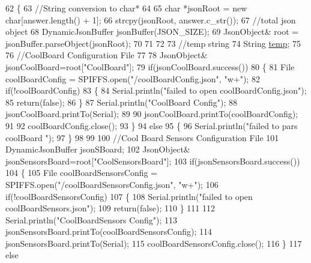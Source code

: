 \begin{DoxyCode}
62 \{
63     \textcolor{comment}{//String conversion to char*}
64 
65     \textcolor{keywordtype}{char} *jsonRoot = \textcolor{keyword}{new} \textcolor{keywordtype}{char}[answer.length() + 1];
66     strcpy(jsonRoot, answer.c\_str());
67     \textcolor{comment}{//total json object }
68     DynamicJsonBuffer jsonBuffer(JSON\_SIZE);
69     JsonObject& root = jsonBuffer.parseObject(jsonRoot);
70 
71 
72         
73     \textcolor{comment}{//temp string}
74     String \hyperlink{Irene3000_8h_a5905d48604152cf57aa6bfa087b49173}{temp};
75 
76     \textcolor{comment}{//CoolBoard Configuration File}
77 
78         JsonObject& jsonCoolBoard=root[\textcolor{stringliteral}{"CoolBoard"}];
79     \textcolor{keywordflow}{if}(jsonCoolBoard.success())
80     \{
81         File coolBoardConfig = SPIFFS.open(\textcolor{stringliteral}{"/coolBoardConfig.json"}, \textcolor{stringliteral}{"w+"});  
82         \textcolor{keywordflow}{if}(!coolBoardConfig)
83         \{   
84             Serial.println(\textcolor{stringliteral}{"failed to open coolBoardConfig.json"});
85             \textcolor{keywordflow}{return}(\textcolor{keyword}{false});
86         \}
87         Serial.println(\textcolor{stringliteral}{"CoolBoard Config"});
88         jsonCoolBoard.printTo(Serial);
89         
90         jsonCoolBoard.printTo(coolBoardConfig);
91         
92         coolBoardConfig.close();
93     \}
94     \textcolor{keywordflow}{else}
95     \{
96         Serial.println(\textcolor{stringliteral}{"failed to pars coolBoard "});
97     \}       
98 
99     
100     \textcolor{comment}{//Cool Board Sensors Configuration File}
101     DynamicJsonBuffer jsonSBoard;
102         JsonObject& jsonSensorsBoard=root[\textcolor{stringliteral}{"CoolSensorsBoard"}];  
103     \textcolor{keywordflow}{if}(jsonSensorsBoard.success())
104     \{   
105         File coolBoardSensorsConfig = SPIFFS.open(\textcolor{stringliteral}{"/coolBoardSensorsConfig.json"}, \textcolor{stringliteral}{"w+"});    
106         \textcolor{keywordflow}{if}(!coolBoardSensorsConfig)
107         \{
108             Serial.println(\textcolor{stringliteral}{"failed to open coolBoardSensors.json"});
109             \textcolor{keywordflow}{return}(\textcolor{keyword}{false});
110         \}
111         
112         Serial.println(\textcolor{stringliteral}{"CoolBoardSensors Config"});
113         jsonSensorsBoard.printTo(coolBoardSensorsConfig);
114         jsonSensorsBoard.printTo(Serial);
115         coolBoardSensorsConfig.close();
116     \}
117     \textcolor{keywordflow}{else}

\end{DoxyCode}
